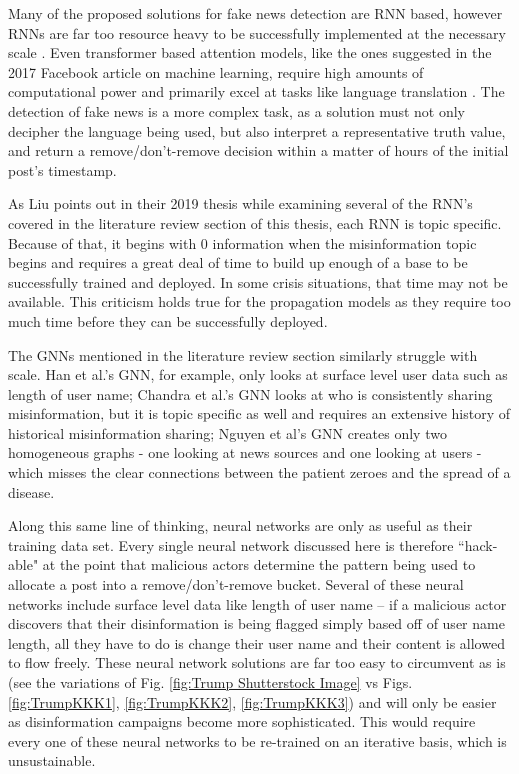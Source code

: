 \documentclass[preprint,review,12pt]{elsarticle}
\begin{document}
Many of the proposed solutions for fake news detection are RNN based, however RNNs are far too resource heavy to be successfully implemented at the necessary scale \cite{gehring2017novel, sze2017efficient}. Even transformer based attention models, like the ones suggested in the 2017 Facebook article on machine learning, require high amounts of computational power and primarily excel at tasks like language translation \cite{vaswani2017attention}. The detection of fake news is a more complex task, as a solution must not only decipher the language being used, but also interpret a representative truth value, and return a remove/don't-remove decision within a matter of hours of the initial post's timestamp.

As Liu points out in their 2019 thesis \cite{liu2019early} while examining several of the RNN's covered in the literature review section of this thesis, each RNN is topic specific. Because of that, it begins with 0 information when the misinformation topic begins and requires a great deal of time to build up enough of a base to be successfully trained and deployed. In some crisis situations, that time may not be available. This criticism holds true for the propagation models as they require too much time before they can be successfully deployed.

The GNNs mentioned in the literature review section similarly struggle with scale. Han et al.'s GNN, for example, only looks at surface level user data such as length of user name; Chandra et al.'s GNN looks at who is consistently sharing misinformation, but it is topic specific as well and requires an extensive history of historical misinformation sharing; Nguyen et al's GNN creates only two homogeneous graphs - one looking at news sources and one looking at users - which misses the clear connections between the patient zeroes and the spread of a disease.

Along this same line of thinking, neural networks are only as useful as their training data set. Every single neural network discussed here is therefore ``hack-able" at the point that malicious actors determine the pattern being used to allocate a post into a remove/don't-remove bucket. Several of these neural networks include surface level data like length of user name -- if a malicious actor discovers that their disinformation is being flagged simply based off of user name length, all they have to do is change their user name and their content is allowed to flow freely. These neural network solutions are far too easy to circumvent as is (see the variations of Fig. \ref{fig:Trump Shutterstock Image} vs Figs. \ref{fig:TrumpKKK1}, \ref{fig:TrumpKKK2}, \ref{fig:TrumpKKK3}) and will only be easier as disinformation campaigns become more sophisticated. This would require every one of these neural networks to be re-trained on an iterative basis, which is unsustainable.
\end{document}
